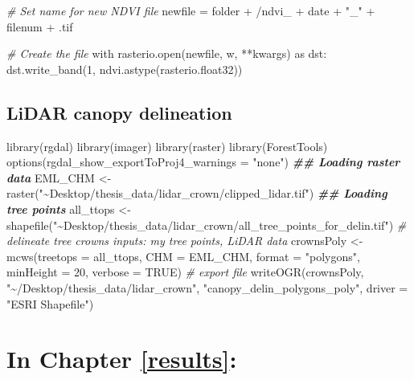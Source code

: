 \documentclass[12pt,twoside]{reedthesis}
\newenvironment{Shaded}{\begin{snugshade}}{\end{snugshade}}
\newcommand{\AttributeTok}[1]{\textcolor[rgb]{0.77,0.63,0.00}{#1}}
\newcommand{\CommentTok}[1]{\textcolor[rgb]{0.56,0.35,0.01}{\textit{#1}}}
\newcommand{\ConstantTok}[1]{\textcolor[rgb]{0.00,0.00,0.00}{#1}}
\newcommand{\DecValTok}[1]{\textcolor[rgb]{0.00,0.00,0.81}{#1}}
\newcommand{\DocumentationTok}[1]{\textcolor[rgb]{0.56,0.35,0.01}{\textbf{\textit{#1}}}}
\newcommand{\FunctionTok}[1]{\textcolor[rgb]{0.00,0.00,0.00}{#1}}
\newcommand{\NormalTok}[1]{#1}
\newcommand{\OtherTok}[1]{\textcolor[rgb]{0.56,0.35,0.01}{#1}}
\newcommand{\SpecialCharTok}[1]{\textcolor[rgb]{0.00,0.00,0.00}{#1}}
\newcommand{\StringTok}[1]{\textcolor[rgb]{0.31,0.60,0.02}{#1}}
\begin{document}
\begin{Shaded}
\begin{Highlighting}[]
    \CommentTok{\# Set name for new NDVI file}
\NormalTok{    newfile }\OtherTok{=}\NormalTok{ folder }\SpecialCharTok{+} \StringTok{\textquotesingle{}/ndvi\_\textquotesingle{}} \SpecialCharTok{+}\NormalTok{ date }\SpecialCharTok{+} \StringTok{"\_"} \SpecialCharTok{+}\NormalTok{ filenum }\SpecialCharTok{+} \StringTok{\textquotesingle{}.tif\textquotesingle{}}

    \CommentTok{\# Create the file}
\NormalTok{    with }\FunctionTok{rasterio.open}\NormalTok{(newfile, }\StringTok{\textquotesingle{}w\textquotesingle{}}\NormalTok{, }\SpecialCharTok{**}\NormalTok{kwargs) as dst}\SpecialCharTok{:}
        \FunctionTok{dst.write\_band}\NormalTok{(}\DecValTok{1}\NormalTok{, }\FunctionTok{ndvi.astype}\NormalTok{(rasterio.float32))}
\end{Highlighting}
\end{Shaded}
\hypertarget{lidar-canopy-delineation}{%
\subsection*{LiDAR canopy delineation}\label{lidar-canopy-delineation}}
\begin{Shaded}
\begin{Highlighting}[]
\FunctionTok{library}\NormalTok{(rgdal)}
\FunctionTok{library}\NormalTok{(imager)}
\FunctionTok{library}\NormalTok{(raster)}
\FunctionTok{library}\NormalTok{(ForestTools)}
\FunctionTok{options}\NormalTok{(}\AttributeTok{rgdal\_show\_exportToProj4\_warnings =} \StringTok{"none"}\NormalTok{)}
\DocumentationTok{\#\# Loading raster data}
\NormalTok{EML\_CHM }\OtherTok{\textless{}{-}} \FunctionTok{raster}\NormalTok{(}\StringTok{"\textasciitilde{}Desktop/thesis\_data/lidar\_crown/clipped\_lidar.tif"}\NormalTok{)}
\DocumentationTok{\#\# Loading tree points}
\NormalTok{all\_ttops }\OtherTok{\textless{}{-}} \FunctionTok{shapefile}\NormalTok{(}\StringTok{"\textasciitilde{}Desktop/thesis\_data/lidar\_crown/all\_tree\_points\_for\_delin.tif"}\NormalTok{)}
\CommentTok{\# delineate tree crowns inputs: my tree points, LiDAR data}
\NormalTok{crownsPoly }\OtherTok{\textless{}{-}} \FunctionTok{mcws}\NormalTok{(}\AttributeTok{treetops =}\NormalTok{ all\_ttops, }\AttributeTok{CHM =}\NormalTok{ EML\_CHM, }\AttributeTok{format =} \StringTok{"polygons"}\NormalTok{,}
    \AttributeTok{minHeight =} \DecValTok{20}\NormalTok{, }\AttributeTok{verbose =} \ConstantTok{TRUE}\NormalTok{)}
\CommentTok{\# export file}
\FunctionTok{writeOGR}\NormalTok{(crownsPoly, }\StringTok{"\textasciitilde{}/Desktop/thesis\_data/lidar\_crown"}\NormalTok{, }\StringTok{"canopy\_delin\_polygons\_poly"}\NormalTok{,}
    \AttributeTok{driver =} \StringTok{"ESRI Shapefile"}\NormalTok{)}
\end{Highlighting}
\end{Shaded}
\hypertarget{in-chapter-refresults}{%
\section{\texorpdfstring{\textbf{In Chapter} \ref{results}\textbf{:}}{In Chapter \ref{results}:}}\label{in-chapter-refresults}}
\end{document}
